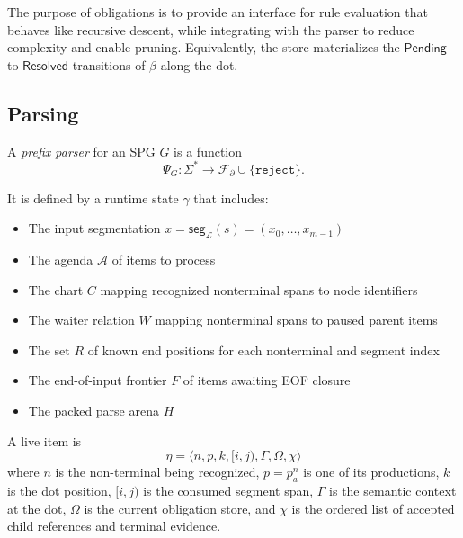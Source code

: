 The purpose of obligations is to provide an interface for rule evaluation that behaves like recursive descent, while integrating with the parser to reduce complexity and enable pruning. Equivalently, the store materializes the $\mathsf{Pending}$-to-$\mathsf{Resolved}$ transitions of $\beta$ along the dot.

%
%

\subsection{Parsing}
\label{sec:engine-parsing}

A \emph{prefix parser} for an SPG $G$ is a function
\[
\Psi_G : \Sigma^* \to \mathcal F_\partial \cup \{\texttt{reject}\}.
\]

\noindent It is defined by a runtime state $\gamma$ that includes:
\begin{itemize}
  \item The input segmentation $x=\mathsf{seg}_{\mathcal L}(s)=(x_0,\ldots,x_{m-1})$
  \item The agenda $\mathcal A$ of items to process
  \item The chart $C$ mapping recognized nonterminal spans to node identifiers
  \item The waiter relation $W$ mapping nonterminal spans to paused parent items
  \item The set $R$ of known end positions for each nonterminal and segment index
  \item The end-of-input frontier $F$ of items awaiting EOF closure
  \item The packed parse arena $H$
\end{itemize}

\noindent A live item is
\[
\eta=\langle n,p,k,[i,j),\Gamma,\Omega,\chi \rangle
\]
where $n$ is the non-terminal being recognized, $p=p^n_a$ is one of its productions, $k$ is the dot position, $[i,j)$ is the consumed segment span, $\Gamma$ is the semantic context at the dot, $\Omega$ is the current obligation store, and $\chi$ is the ordered list of accepted child references and terminal evidence.

